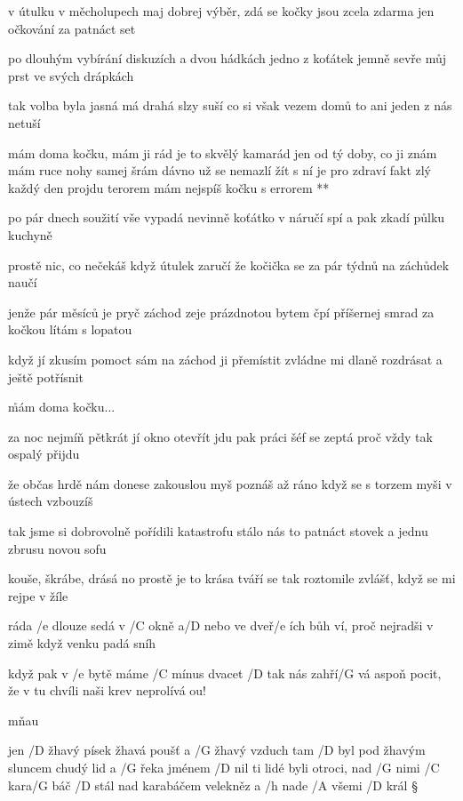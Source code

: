 v útulku v měcholupech maj dobrej výběr, zdá se
kočky jsou zcela zdarma jen očkování za patnáct set \s

po dlouhým vybírání diskuzích a dvou hádkách
jedno z koťátek jemně sevře můj prst ve svých drápkách \s

tak volba byla jasná má drahá slzy suší
co si však vezem domů to ani jeden z nás netuší

\R mám doma kočku, mám ji rád je to skvělý kamarád
   jen od tý doby, co ji znám mám ruce nohy samej šrám
   dávno už se nemazlí žít s ní je pro zdraví fakt zlý
   každý den projdu terorem mám nejspíš kočku s errorem **

po pár dnech soužití vše vypadá nevinně
koťátko v náručí spí a pak zkadí půlku kuchyně \s

prostě nic, co nečekáš když útulek zaručí
že kočička se za pár týdnů na záchůdek naučí \s

jenže pár měsíců je pryč záchod zeje prázdnotou
bytem čpí příšernej smrad za kočkou lítám s lopatou \s

když jí zkusím pomoct sám na záchod ji přemístit
zvládne mi dlaně rozdrásat a ještě potřísnit

\r mám doma kočku...

za noc nejmíň pětkrát jí okno otevřít jdu
pak práci šéf se zeptá proč vždy tak ospalý přijdu \s

že občas hrdě nám donese zakouslou myš
poznáš až ráno když se s torzem myši v ústech vzbouzíš \s

tak jsme si dobrovolně pořídili katastrofu
stálo nás to patnáct stovek a jednu zbrusu novou sofu \s

kouše, škrábe, drásá no prostě je to krása
tváří se tak roztomile zvlášť, když se mi rejpe v žíle

\rr \songgg

ráda /e dlouze sedá v /C okně a/D nebo ve dveř/e ích
bůh ví, proč nejradši v zimě když venku padá sníh

když pak v /e bytě máme /C mínus dvacet /D tak nás zahří/G vá
aspoň pocit, že v tu chvíli naši krev neprolívá
ou!

\rr

mňau




jen /D žhavý písek žhavá poušť a /G žhavý vzduch tam /D byl
pod žhavým sluncem chudý lid a /G řeka jménem /D nil
ti lidé byli otroci, nad /G nimi /C kara/G báč /D stál
nad karabáčem velekněz a /h nade /A všemi /D král \S

